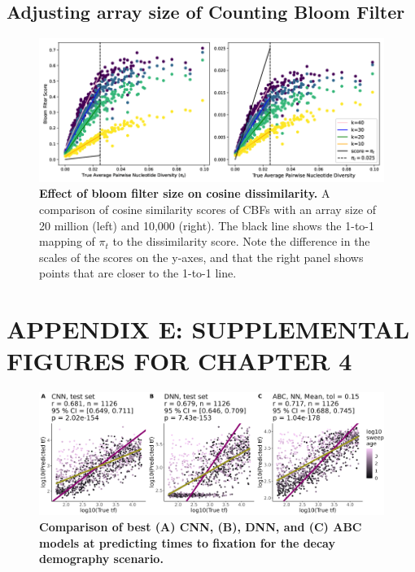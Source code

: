 \documentclass[12pt]{article}
\begin{document}
\subsection*{Adjusting array size of Counting Bloom Filter}
    
\begin{figure}[H]
\centering
  \includegraphics[width=\textwidth]{figures/appendix_e/bloom_filter_array_size.png}
  \caption{\textbf{Effect of bloom filter size on cosine dissimilarity.} A comparison of cosine similarity scores of CBFs with an array size of 20 million (left) and 10,000 (right). The black line shows the 1-to-1 mapping of $\pi_t$ to the dissimilarity score. Note the difference in the scales of the scores on the y-axes, and that the right panel shows points that are closer to the 1-to-1 line.}
  \label{fig:cbf_array}
\end{figure}

\newpage

\section*{APPENDIX E: SUPPLEMENTAL FIGURES FOR CHAPTER 4}

\setcounter{figure}{0}
\renewcommand{\figurename}{Figure}
\renewcommand{\thefigure}{E\arabic{figure}}


\begin{figure}[H]
\centering
  \includegraphics[width=\textwidth]{figures/appendix_g/best_models_decay_2025-03-07.png}
  \caption{\textbf{Comparison of best (A) CNN, (B), DNN, and (C) ABC models at predicting times to fixation for the decay demography scenario.}}
  \label{fig:decay_comparison}
\end{figure}
\end{document}
